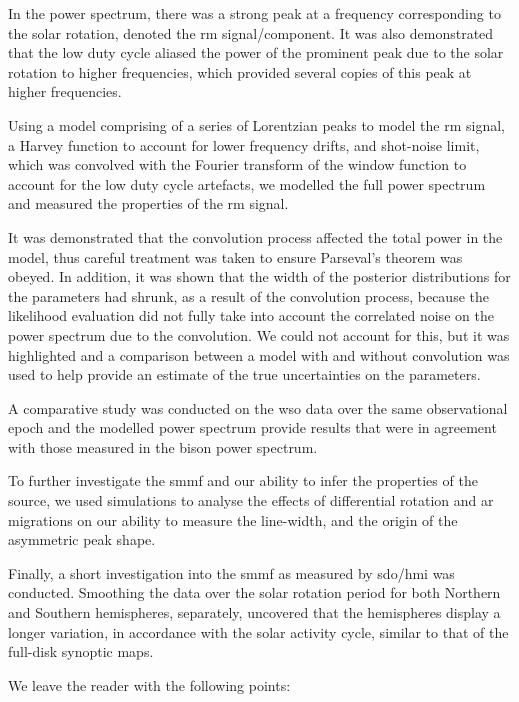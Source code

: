 In the power spectrum, there was a strong peak at a frequency corresponding to the solar rotation, denoted the \gls{rm} signal/component. It was also demonstrated that the low duty cycle aliased the power of the prominent peak due to the solar rotation to higher frequencies, which provided several copies of this peak at higher frequencies.

Using a model comprising of a series of Lorentzian peaks to model the \gls{rm} signal, a Harvey function to account for lower frequency drifts, and shot-noise limit, which was convolved with the Fourier transform of the window function to account for the low duty cycle artefacts, we modelled the full power spectrum and measured the properties of the \gls{rm} signal.

It was demonstrated that the convolution process affected the total power in the model, thus careful treatment was taken to ensure Parseval's theorem was obeyed. In addition, it was shown that the width of the posterior distributions for the parameters had shrunk, as a result of the convolution process, because the likelihood evaluation did not fully take into account the correlated noise on the power spectrum due to the convolution. We could not account for this, but it was highlighted and a comparison between a model with and without convolution was used to help provide an estimate of the true uncertainties on the parameters.

A comparative study was conducted on the \gls{wso} data over the same observational epoch and the modelled power spectrum provide results that were in agreement with those measured in the \gls{bison} power spectrum.

To further investigate the \gls{smmf} and our ability to infer the properties of the source, we used simulations to analyse the effects of differential rotation and \gls{ar} migrations on our ability to measure the line-width, and the origin of the asymmetric peak shape.

Finally, a short investigation into the \gls{smmf} as measured by \gls{sdo/hmi} was conducted. Smoothing the data over the solar rotation period for both Northern and Southern hemispheres, separately, uncovered that the hemispheres display a longer variation, in accordance with the solar activity cycle, similar to that of the full-disk synoptic maps.

We leave the reader with the following points:

